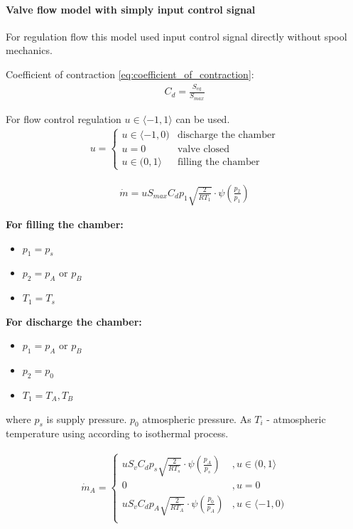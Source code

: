 \documentclass[class=article, crop=false]{standalone}
\begin{document}
\paragraph{Valve flow model with simply input control signal}
For regulation flow this model used input control signal directly without
spool mechanics.

Coefficient of contraction \ref{eq:coefficient_of_contraction}:
\begin{align}
    C_d = \frac{S_{eq}}{S_{max}}
    \label{eq:coefficient_of_contraction}
\end{align}

For flow control regulation $u \in \langle-1,1\rangle$ can be used.
\begin{align}
    u =
    \begin{cases}
        u \in \langle -1, 0) & \text{discharge the chamber} \\
        u = 0& \text{valve closed}  \\
        u \in (0, 1\rangle & \text{filling the chamber} 
    \end{cases}
\end{align} 

\begin{align}
    \dot{m} = u S_{max} C_d p_1 \sqrt{\frac{2}{RT_1}}
    \cdot \psi\left(\frac{p_2}{p_1}\right)
    \label{eq:flow}
\end{align}

\textbf{For filling the chamber:}
\begin{itemize}
\item $p_1 = p_s$ 
\item $p_2 = p_A \text{ or } p_B$
\item $T_1 = T_s$
\end{itemize}

\textbf{For discharge the chamber:}
\begin{itemize}
\item $p_1 = p_A \text{ or } p_B$
\item $p_2 = p_0$
\item $T_1 = T_A, T_B$
\end{itemize}

where $p_s$ is supply pressure. $p_0$ atmospheric pressure. As $T_i$ - 
atmospheric temperature using according to isothermal process.

\begin{align}
    \dot{m}_A =
    \begin{cases}
        u S_v C_d p_s \sqrt{\frac{2}{RT_s}}
        \cdot \psi\left(\frac{p_A}{p_s}\right)  &,   u \in (0, 1 \rangle \\
        0   &,  u = 0 \\
        u S_v C_d p_A \sqrt{\frac{2}{RT_A}}
        \cdot \psi\left(\frac{p_0}{p_A}\right)  &,   u \in \langle -1, 0) \\
    \end{cases}
\end{align}
\end{document}
